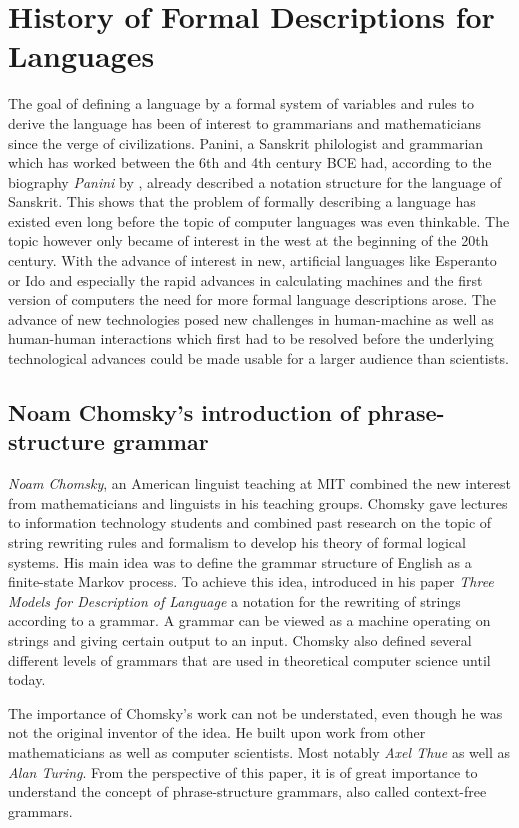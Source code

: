 \documentclass{article}
\begin{document}
\section{History of Formal Descriptions for Languages}
The goal of defining a language by a formal system of variables and rules to derive the language has been of interest to grammarians and mathematicians since the verge of civilizations. Panini, a Sanskrit philologist and grammarian which has worked between the 6th and 4th century BCE had, according to the biography \textit{Panini} by \citet{bhate2002panini}, already described a notation structure for the language of Sanskrit. This shows that the problem of formally describing a language has existed even long before the topic of computer languages was even thinkable. The topic however only became of interest in the west at the beginning of the 20th century. With the advance of interest in new, artificial languages like Esperanto or Ido and especially the rapid advances in calculating machines and the first version of computers the need for more formal language descriptions arose. The advance of new technologies posed new challenges in human-machine as well as human-human interactions which first had to be resolved before the underlying technological advances could be made usable for a larger audience than scientists.

\subsection{Noam Chomsky's introduction of phrase-structure grammar}
\textit{Noam Chomsky}, an American linguist teaching at MIT combined the new interest from mathematicians and linguists in his teaching groups. Chomsky gave lectures to information technology students and combined past research on the topic of string rewriting rules and formalism to develop his theory of formal logical systems. His main idea was to define the grammar structure of English as a finite-state Markov process. To achieve this idea, \citet{1056813} introduced in his paper \textit{Three Models for Description of Language} a notation for the rewriting of strings according to a grammar. A grammar can be viewed as a machine operating on strings and giving certain output to an input. Chomsky also defined several different levels of grammars that are used in theoretical computer science until today.

The importance of Chomsky’s work can not be understated, even though he was not the original inventor of the idea. He built upon work from other mathematicians as well as computer scientists. Most notably \textit{Axel Thue} as well as \textit{Alan Turing}. From the perspective of this paper, it is of great importance to understand the concept of phrase-structure grammars, also called context-free grammars.
\end{document}
